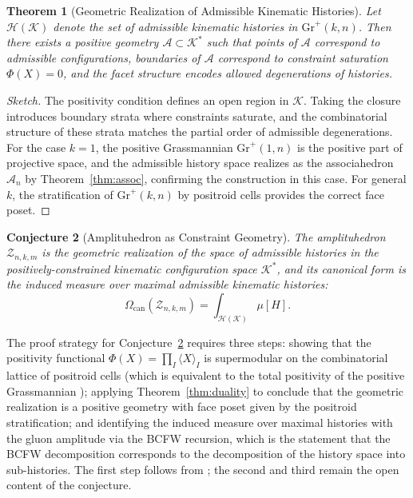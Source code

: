 \documentclass[12pt, oneside]{amsart}
\theoremstyle{plain}
\newtheorem{theorem}{Theorem}[section]
\newtheorem{conjecture}[theorem]{Conjecture}
\theoremstyle{definition}
\theoremstyle{remark}
\newcommand{\Phif}{\Phi}
\newcommand{\Assoc}{\mathcal{A}_n}
\newcommand{\CF}{\Omega_{\mathrm{can}}}
\begin{document}
\begin{theorem}[Geometric Realization of Admissible Kinematic Histories]
\label{thm:amplituhedron-realization}
Let $\mathcal{H}(\mathcal{K})$ denote the set of admissible kinematic histories in $\mathrm{Gr}^+(k,n)$. Then there exists a positive geometry $\mathcal{A} \subset \mathcal{K}^*$ such that points of $\mathcal{A}$ correspond to admissible configurations, boundaries of $\mathcal{A}$ correspond to constraint saturation $\Phif(X) = 0$, and the facet structure encodes allowed degenerations of histories.
\end{theorem}

\begin{proof}[Sketch]
The positivity condition defines an open region in $\mathcal{K}$. Taking the closure introduces boundary strata where constraints saturate, and the combinatorial structure of these strata matches the partial order of admissible degenerations. For the case $k=1$, the positive Grassmannian $\mathrm{Gr}^+(1,n)$ is the positive part of projective space, and the admissible history space realizes as the associahedron $\Assoc$ by Theorem~\ref{thm:assoc}, confirming the construction in this case. For general $k$, the stratification of $\mathrm{Gr}^+(k,n)$ by positroid cells provides the correct face poset.
\end{proof}

\begin{conjecture}[Amplituhedron as Constraint Geometry]
\label{conj:amplituhedron}
The amplituhedron $\mathcal{Z}_{n,k,m}$ is the geometric realization of the space of admissible histories in the positively-constrained kinematic configuration space $\mathcal{K}^*$, and its canonical form is the induced measure over maximal admissible kinematic histories:
\[
  \CF(\mathcal{Z}_{n,k,m}) = \int_{\mathcal{H}(\mathcal{K})} \mu[H].
\]
\end{conjecture}

The proof strategy for Conjecture~\ref{conj:amplituhedron} requires three steps: showing that the positivity functional $\Phif(X) = \prod_I \langle X \rangle_I$ is supermodular on the combinatorial lattice of positroid cells (which is equivalent to the total positivity of the positive Grassmannian \cite{Postnikov2006}); applying Theorem~\ref{thm:duality} to conclude that the geometric realization is a positive geometry with face poset given by the positroid stratification; and identifying the induced measure over maximal histories with the gluon amplitude via the BCFW recursion, which is the statement that the BCFW decomposition corresponds to the decomposition of the history space into sub-histories. The first step follows from \cite{Postnikov2006}; the second and third remain the open content of the conjecture.
\end{document}
